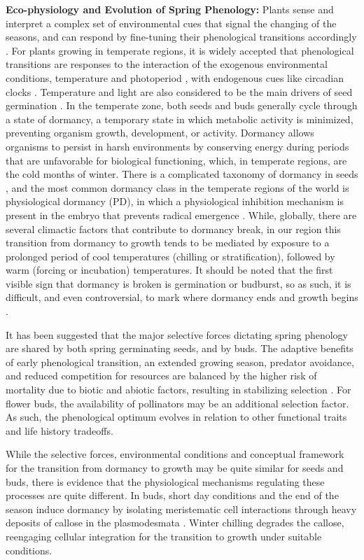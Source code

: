 \documentclass[12pt]{article}\usepackage[]{graphicx}\usepackage[]{color}
\begin{document}
\indent\indent\textbf{Eco-physiology and Evolution of Spring Phenology:} Plants sense and interpret a complex set of environmental cues that signal the changing of the seasons, and can respond by fine-tuning their phenological transitions accordingly \citep{Vitasse2010}. For plants growing in temperate regions, it is widely accepted that phenological transitions are responses to the interaction of the exogenous environmental conditions, temperature and photoperiod \citep{Forrest2010}, with endogenous cues like circadian clocks \citep{Visser2010}. Temperature and light are also considered to be the main drivers of seed germination \citep{Finch-Savage2006}. In the temperate zone, both seeds and buds generally cycle through a state of dormancy, a temporary state in which metabolic activity is minimized, preventing organism growth, development, or activity. Dormancy allows organisms to persist in harsh environments by conserving energy during periods that are unfavorable for biological functioning, which, in temperate regions, are the cold months of winter. There is a complicated taxonomy of dormancy in seeds \citep{Baskin2004}, and the most common dormancy class in the temperate regions of the world is physiological dormancy (PD), in which a physiological inhibition mechanism is present in the embryo that prevents radical emergence \citep{Finch-Savage2006}. While, globally, there are several climactic factors that contribute to dormancy break, in our region this transition from dormancy to growth tends to be mediated by exposure to a prolonged period of cool temperatures (chilling or stratification), followed by warm (forcing or incubation) temperatures. It should be noted that the first visible sign that dormancy is broken is germination or budburst, so as such, it is difficult, and even controversial, to mark where dormancy ends and growth begins \citep{Long2015,Bewley1997}.
\par It has been suggested that the major selective forces dictating spring phenology are shared by both spring germinating seeds, and by buds. The adaptive benefits of early phenological transition, an extended growing season, predator avoidance, and reduced competition for resources are balanced by the higher risk of mortality due to biotic and abiotic factors, resulting in stabilizing selection \citep{Rathcke1985}. For flower buds, the availability of pollinators may be an additional selection factor. As such, the phenological optimum evolves in relation to other functional traits and life history tradeoffs. 
\par While the selective forces, environmental conditions and conceptual framework for the transition from dormancy to growth may be quite similar for seeds and buds, there is evidence that the physiological mechanisms regulating these processes are quite different. In buds, short day conditions and the end of the season induce dormancy by isolating meristematic cell interactions through heavy deposits of callose in the plasmodesmata \citep{Rinne2011,Sager2014}. Winter chilling degrades the callose, reengaging cellular integration for the transition to growth under suitable conditions. 
\end{document}
